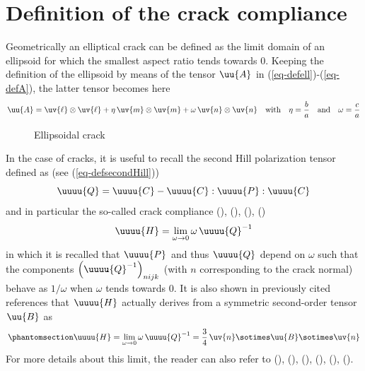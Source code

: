 \documentclass[
  letterpaper,
  DIV=11,
  numbers=noendperiod]{scrreprt}
\begin{document}
\section{Definition of the crack
compliance}\label{definition-of-the-crack-compliance}

Geometrically an elliptical crack can be defined as the limit domain of
an ellipsoid for which the smallest aspect ratio tends towards 0.
Keeping the definition of the ellipsoid by means of the tensor
\(\uu{A}\) in (\ref{eq-defell})-(\ref{eq-defA}), the latter tensor
becomes here \[
\uu{A}=
\uv{\ell}\otimes\uv{\ell}+
\eta\,\uv{m}\otimes\uv{m}+
\omega\,\uv{n}\otimes\uv{n}
\quad\textrm{with}\quad
\eta=\frac{b}{a}
\quad\textrm{and}\quad
\omega=\frac{c}{a}
\]

\begin{figure}


\caption{\label{fig-crack}Ellipsoidal crack}

\end{figure}%

In the case of cracks, it is useful to recall the second Hill
polarization tensor defined as (see (\ref{eq-defsecondHill})) \[
\uuuu{Q}=\uuuu{C}-\uuuu{C}:\uuuu{P}:\uuuu{C}
\] and in particular the so-called crack compliance
(),
(),
(),
() \[
\uuuu{H}=\lim_{\omega\to 0}\omega\,\uuuu{Q}^{-1}
\] in which it is recalled that \(\uuuu{P}\) and thus \(\uuuu{Q}\)
depend on \(\omega\) such that the components
\(\left(\uuuu{Q}^{-1}\right)_{nijk}\) (with \(n\) corresponding to the
crack normal) behave as \(1/\omega\) when \(\omega\) tends towards
\(0\). It is also shown in previously cited references that \(\uuuu{H}\)
actually derives from a symmetric second-order tensor \(\uu{B}\) as
\begin{equation}\phantomsection\label{eq-H}{
\uuuu{H}=
\lim_{\omega\to 0} \omega\,\uuuu{Q}^{-1}
=\frac{3}{4}\,\uv{n}\sotimes\uu{B}\sotimes\uv{n}
}\end{equation} For more details about this limit, the reader can also
refer to (),
(),
(),
(),
(),
().
\end{document}
